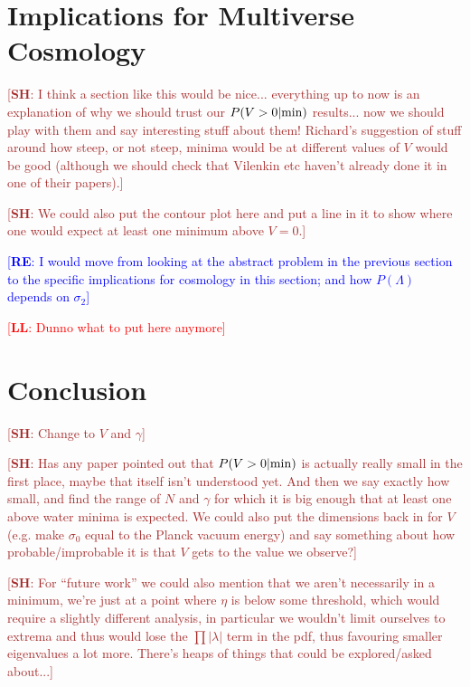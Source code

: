 \documentclass[12pt]{article}
\newcommand{\re}[1]{\textcolor{blue}{[{\bf RE}: #1]}}
\newcommand{\lfl}[1]{\textcolor{red}{[{\bf LL}: #1]}}
\newcommand{\SH}[1]{\textcolor{brown}{[{\bf SH}: #1]}}
\begin{document}
\section{Implications for Multiverse Cosmology}

\SH{I think a section like this would be nice... everything up to now is an explanation of why we should trust our $P(V>0|{\rm min})$ results... now we should play with them and say interesting stuff about them! Richard's suggestion of stuff around how steep, or not steep, minima would be at different values of $V$ would be good (although we should check that Vilenkin etc haven't already done it in one of their papers).}

\SH{We could also put the contour plot here and put a line in it to show where one would expect at least one minimum above $V=0$.}
  
\re{I would move from looking at the abstract problem in the previous section to the specific implications for cosmology in this section; and how $P(\Lambda)$ depends on $\sigma_2$}

\lfl{Dunno what to put here anymore}

\section{Conclusion}
\SH{Change to $V$ and $\gamma$}

\SH{Has any paper pointed out that $P(V>0|{\rm min})$ is actually really small in the first place, maybe that itself isn't understood yet. And then we say exactly how small, and find the range of $N$ and $\gamma$ for which it is big enough that at least one above water minima is expected. We could also put the dimensions back in for $V$ (e.g. make $\sigma_0$ equal to the Planck vacuum energy)  and say something about how probable/improbable it is that $V$ gets to the value we observe?}

\SH{For ``future work'' we could also mention that we aren't necessarily in a minimum, we're just at a point where $\eta$ is below some threshold, which would require a slightly different analysis, in particular we wouldn't limit ourselves to extrema and thus would lose the $\prod |\lambda|$ term in the pdf, thus favouring smaller eigenvalues a lot more. There's heaps of things that could be explored/asked about...}
\end{document}
